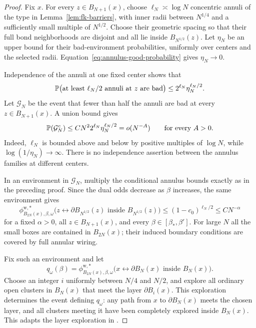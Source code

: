 \begin{proof}
Fix $x$. For every $z\in B_{N+1}(x)$, choose
$\ell_N\asymp\log N$ concentric annuli of the type in
Lemma~\ref{lem:fk-barriers}, with inner radii between $N^{1/4}$
and a sufficiently small multiple of $N^{1/2}$. Choose their
geometric spacing so that their full bond neighborhoods are disjoint
and all lie inside $B_{N^{1/2}}(z)$. Let $\eta_N$ be an upper bound
for their bad-environment probabilities, uniformly over centers and
the selected radii. Equation~\eqref{eq:annulus-good-probability}
gives $\eta_N\to0$.

Independence of the annuli at one fixed center shows that
\[
 \mathbb P\bigl(\text{at least }\ell_N/2
                       \text{ annuli at }z\text{ are bad}\bigr)
                  \le2^{\ell_N}\eta_N^{\ell_N/2}.
\]
Let $\mathcal G_N$ be the event that fewer than half the annuli
are bad at every $z\in B_{N+1}(x)$. A union bound gives
\begin{equation}
 \mathbb P(\mathcal G_N^c)
       \le C N^2 2^{\ell_N}\eta_N^{\ell_N/2}
       =o(N^{-A})\qquad\text{for every }A>0.
 \label{eq:amplified-environment-bound}
\end{equation}
Indeed, $\ell_N$ is bounded above and below by positive multiples
of $\log N$, while $\log(1/\eta_N)\to\infty$. There is no
independence assertion between the annulus families at different
centers.

In an environment in $\mathcal G_N$, multiply the conditional
annulus bounds exactly as in the preceding proof. Since the dual
odds decrease as $\beta$ increases, the same environment gives
\begin{equation}
 \phi_{B_{2N}(x),\beta,\omega}^{\mathrm w,*}
 \bigl(z\leftrightarrow\partial B_{N^{1/2}}(z)
                 \text{ inside }B_{N^{1/2}}(z)\bigr)
       \le(1-c_0)^{\ell_N/2}
       \le C N^{-\alpha}
 \label{eq:uniform-short-dual-arms}
\end{equation}
for a fixed $\alpha>0$, all $z\in B_{N+1}(x)$, and every
$\beta\in[\beta_*,\beta']$. For large $N$ all the small boxes
are contained in $B_{2N}(x)$; their induced boundary conditions are
covered by full annular wiring.

Fix such an environment and let
\[
 q_\omega(\beta)=\phi_{B_{2N}(x),\beta,\omega}^{\mathrm w,*}
  \bigl(x\leftrightarrow\partial B_N(x)
                    \text{ inside }B_N(x)\bigr).
\]
Choose an integer $i$ uniformly between $N/4$ and $N/2$, and explore
all ordinary open clusters in $B_N(x)$ that meet the layer
$\partial B_i(x)$. This exploration determines the event defining
$q_\omega$: any path from $x$ to $\partial B_N(x)$ meets the
chosen layer, and all clusters meeting it have been completely
explored inside $B_N(x)$. This adapts the layer exploration in
\cite[Lemma~3.2 and its proof]{DCRT}.


\end{proof}
